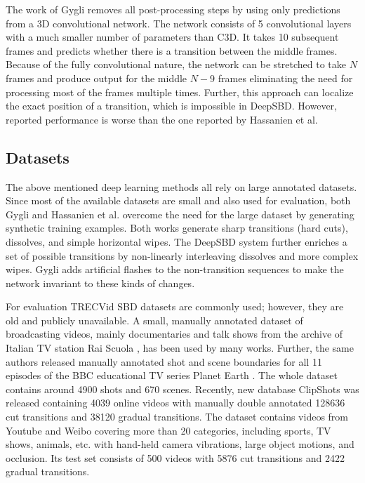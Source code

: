 The work of Gygli removes all post-processing steps by using only predictions from a 3D convolutional network. The network consists of 5 convolutional layers with a much smaller number of parameters than C3D. It takes 10 subsequent frames and predicts whether there is a transition between the middle frames. Because of the fully convolutional nature, the network can be stretched to take $N$ frames and produce output for the middle $N-9$ frames eliminating the need for processing most of the frames multiple times.  Further, this approach can localize the exact position of a transition, which is impossible in DeepSBD. However, reported performance is worse than the one reported by Hassanien et al.

\subsection{Datasets}
The above mentioned deep learning methods all rely on large annotated datasets. Since most of the available datasets are small and also used for evaluation, both Gygli \cite{Gygli18} and Hassanien et al. \cite{Hassanien17} overcome the need for the large dataset by generating synthetic training examples. Both works generate sharp transitions (hard cuts), dissolves, and simple horizontal wipes. The DeepSBD system further enriches a set of possible transitions by non-linearly interleaving dissolves and more complex wipes. Gygli adds artificial flashes to the non-transition sequences to make the network invariant to these kinds of changes.

For evaluation TRECVid SBD datasets are commonly used; however, they are old and publicly unavailable. A small, manually annotated dataset of broadcasting videos, mainly documentaries and talk shows from the archive of Italian TV station Rai Scuola \cite{Baraldi15}, has been used by many works. Further, the same authors released manually annotated shot and scene boundaries for all 11 episodes of the BBC educational TV series Planet Earth \cite{BaraldiScenes}. The whole dataset contains around 4900 shots and 670 scenes. Recently, new database ClipShots \cite{Tang2018} was released containing 4039 online videos with manually double annotated 128636 cut transitions and 38120 gradual transitions. The dataset contains videos from Youtube and Weibo covering more than 20 categories, including sports, TV shows, animals, etc. with hand-held camera vibrations, large object motions, and occlusion. Its test set consists of 500 videos with 5876 cut transitions and 2422 gradual transitions.

